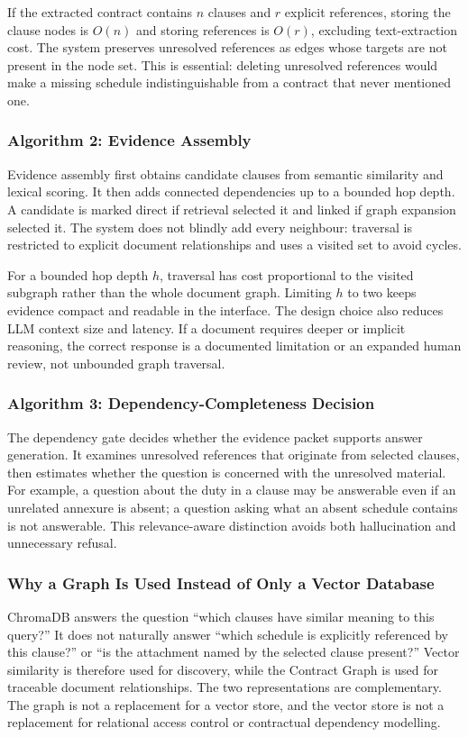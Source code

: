 \documentclass[12pt,a4paper,oneside]{report}
\begin{document}
If the extracted contract contains \(n\) clauses and \(r\) explicit references, storing the clause nodes is \(O(n)\) and storing references is \(O(r)\), excluding text-extraction cost. The system preserves unresolved references as edges whose targets are not present in the node set. This is essential: deleting unresolved references would make a missing schedule indistinguishable from a contract that never mentioned one.

\subsubsection{Algorithm 2: Evidence Assembly}
Evidence assembly first obtains candidate clauses from semantic similarity and lexical scoring. It then adds connected dependencies up to a bounded hop depth. A candidate is marked direct if retrieval selected it and linked if graph expansion selected it. The system does not blindly add every neighbour: traversal is restricted to explicit document relationships and uses a visited set to avoid cycles.



For a bounded hop depth \(h\), traversal has cost proportional to the visited subgraph rather than the whole document graph. Limiting \(h\) to two keeps evidence compact and readable in the interface. The design choice also reduces LLM context size and latency. If a document requires deeper or implicit reasoning, the correct response is a documented limitation or an expanded human review, not unbounded graph traversal.

\subsubsection{Algorithm 3: Dependency-Completeness Decision}
The dependency gate decides whether the evidence packet supports answer generation. It examines unresolved references that originate from selected clauses, then estimates whether the question is concerned with the unresolved material. For example, a question about the duty in a clause may be answerable even if an unrelated annexure is absent; a question asking what an absent schedule contains is not answerable. This relevance-aware distinction avoids both hallucination and unnecessary refusal.



\subsubsection{Why a Graph Is Used Instead of Only a Vector Database}
ChromaDB answers the question ``which clauses have similar meaning to this query?'' It does not naturally answer ``which schedule is explicitly referenced by this clause?'' or ``is the attachment named by the selected clause present?'' Vector similarity is therefore used for discovery, while the Contract Graph is used for traceable document relationships. The two representations are complementary. The graph is not a replacement for a vector store, and the vector store is not a replacement for relational access control or contractual dependency modelling.
\end{document}
